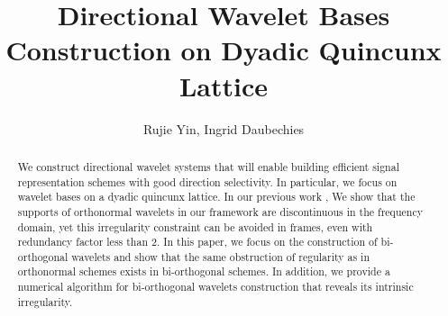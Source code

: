 \documentclass[]{article}
\begin{document}
\newtheorem{lem}{Lemma}
\newtheorem*{mydef}{Definition}
\newtheorem{thm}{Theorem}
\newtheorem{prop}{Proposition}
\newtheorem*{notat}{Notation}

\abovedisplayskip=2pt
\belowdisplayskip=2pt
\abovedisplayshortskip=2pt
\belowdisplayshortskip=2pt


\title{Directional Wavelet Bases Construction on Dyadic Quincunx Lattice}
\author{Rujie Yin, Ingrid Daubechies}
\maketitle

\begin{abstract}
We construct directional wavelet systems that will enable building efficient signal representation schemes with good direction selectivity. In particular, we focus on wavelet bases on a dyadic quincunx lattice.
In our previous work \cite{yin2014orthshear}, We show that the supports of orthonormal wavelets in our framework are discontinuous in the frequency domain, yet this irregularity constraint can be avoided in frames, even with redundancy factor less than 2. In this paper, we focus on the construction of bi-orthogonal wavelets and show that the same obstruction of regularity as in orthonormal schemes exists in bi-orthogonal schemes. In addition, we provide a numerical algorithm for bi-orthogonal wavelets construction that reveals its intrinsic irregularity.
\end{abstract}




%


%


%


%


%

\newpage
\begin{appendices}



%
%
\end{appendices}


\end{document}

